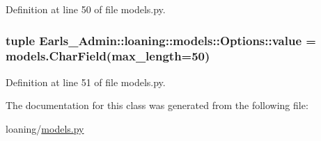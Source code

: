 Definition at line 50 of file models.py.\hypertarget{classEarls__Admin_1_1loaning_1_1models_1_1Options_43efaedbb98677892753102256335432}{
\subsubsection[value]{\setlength{\rightskip}{0pt plus 5cm}tuple {\bf Earls\_\-Admin::loaning::models::Options::value} = models.CharField(max\_\-length=50)}}
\label{classEarls__Admin_1_1loaning_1_1models_1_1Options_43efaedbb98677892753102256335432}




Definition at line 51 of file models.py.

The documentation for this class was generated from the following file:\begin{CompactItemize}
\item 
loaning/\hyperlink{loaning_2models_8py}{models.py}\end{CompactItemize}
